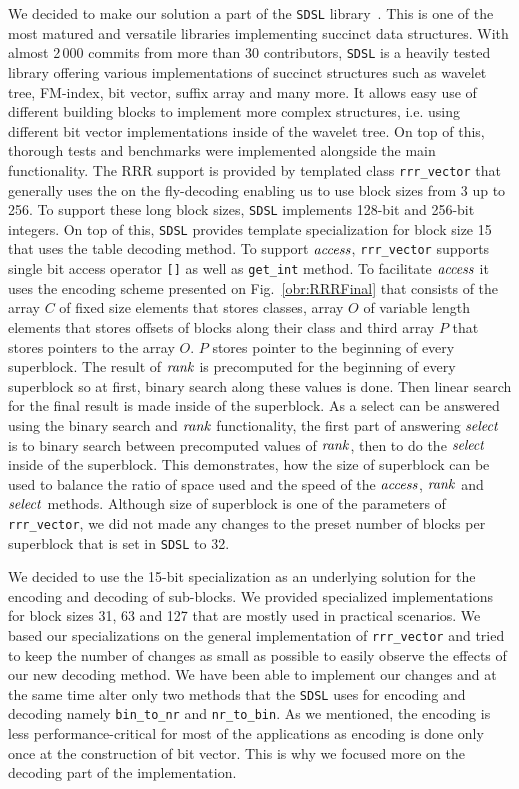 We decided to make our solution a part of the \texttt{SDSL} library~\citep{gog2014theory}. This
is one of the most matured and versatile libraries implementing succinct data structures.
With almost 2\,000 commits from more than 30 contributors, \texttt{SDSL} is a heavily tested library
offering various implementations of succinct structures such as wavelet tree, FM-index,
bit vector, suffix array and many more. It allows easy use of different building blocks
to implement more complex structures, i.e. using different bit vector implementations inside
of the wavelet tree. On top of this, thorough tests and benchmarks were implemented alongside
the main functionality. The RRR support is provided by templated class \texttt{rrr\_vector}
that generally uses the on the fly-decoding enabling us to use block sizes from 3 up to 256. To support
these long block sizes, \texttt{SDSL} implements 128-bit and 256-bit integers. On top of this, \texttt{SDSL}
provides template specialization for block size 15 that uses the table decoding method. To support $\mathit{access}$,
\texttt{rrr\_vector} supports single bit access operator \texttt{[]} as well as \texttt{get\_int} method.
To facilitate $\mathit{access}$ it uses the encoding scheme presented on Fig.~\ref{obr:RRRFinal} that
consists of the array $C$ of fixed size elements that stores classes, array $O$ of variable length
elements that stores offsets of blocks along their class and third array $P$ that stores pointers
to the array $O$. $P$ stores pointer to the beginning of every superblock. The result of $\mathit{rank}$ is
precomputed for the beginning of every superblock so at first, binary search along these values
is done. Then linear search for the final result is made inside of the superblock. As a select
can be answered using the binary search and $\mathit{rank}$ functionality, the first part of answering $\mathit{select}$ is to
binary search between precomputed values of $\mathit{rank}$, then to do the $\mathit{select}$ inside of the superblock.
This demonstrates, how the size of superblock can be used to balance the ratio of space used and the
speed of the $\mathit{access}$, $\mathit{rank}$ and $\mathit{select}$ methods. Although size of superblock is one of the parameters
of \texttt{rrr\_vector}, we did not made any changes to the preset number of blocks per superblock that is
set in \texttt{SDSL} to 32.

We decided to use the 15-bit specialization as an underlying solution for the encoding and decoding of
sub-blocks. We provided specialized implementations for block sizes 31, 63 and 127 that are mostly used
in practical scenarios. We based our specializations on the general implementation of
\texttt{rrr\_vector} and tried to keep the number of changes as small as possible to easily observe the
effects of our new decoding method. We have been able to implement our changes and at the same time alter
only two methods that the \texttt{SDSL} uses for encoding and decoding namely \texttt{bin\_to\_nr} and
\texttt{nr\_to\_bin}. As we mentioned, the encoding is less performance-critical for most of the applications
as encoding is done only once at the construction of bit vector. This is why we focused more on the decoding
part of the implementation.

